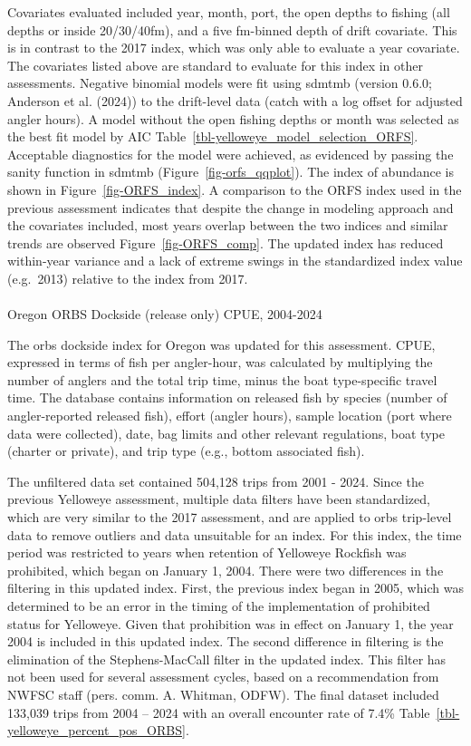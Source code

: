 \documentclass[
]{scrartcl}
\makeatletter
\let\oldparagraph\paragraph
\renewcommand{\paragraph}{
    \@ifstar
      \xxxParagraphStar
      \xxxParagraphNoStar
  }
\newcommand{\xxxParagraphStar}[1]{\oldparagraph*{#1}\mbox{}}
\newcommand{\xxxParagraphNoStar}[1]{\oldparagraph{#1}\mbox{}}
\makeatother
\begin{document}
Covariates evaluated included year, month, port, the open depths to
fishing (all depths or inside 20/30/40fm), and a five fm-binned depth of
drift covariate. This is in contrast to the 2017 index, which was only
able to evaluate a year covariate. The covariates listed above are
standard to evaluate for this index in other assessments. Negative
binomial models were fit using \gls{sdmtmb} (version 0.6.0; Anderson et
al. (2024)) to the drift-level data (catch with a log offset for
adjusted angler hours). A model without the open fishing depths or month
was selected as the best fit model by AIC
Table~\ref{tbl-yelloweye_model_selection_ORFS}. Acceptable diagnostics
for the model were achieved, as evidenced by passing the sanity function
in \gls{sdmtmb} (Figure~\ref{fig-orfs_qqplot}). The index of abundance
is shown in Figure~\ref{fig-ORFS_index}. A comparison to the ORFS index
used in the previous assessment indicates that despite the change in
modeling approach and the covariates included, most years overlap
between the two indices and similar trends are observed
Figure~\ref{fig-ORFS_comp}. The updated index has reduced within-year
variance and a lack of extreme swings in the standardized index value
(e.g.~2013) relative to the index from 2017.

\paragraph{Oregon ORBS Dockside (release only) CPUE,
2004-2024}\label{oregon-orbs-dockside-release-only-cpue-2004-2024}

The \gls{orbs} dockside index for Oregon was updated for this
assessment. CPUE, expressed in terms of fish per angler-hour, was
calculated by multiplying the number of anglers and the total trip time,
minus the boat type-specific travel time. The database contains
information on released fish by species (number of angler-reported
released fish), effort (angler hours), sample location (port where data
were collected), date, bag limits and other relevant regulations, boat
type (charter or private), and trip type (e.g., bottom associated fish).

The unfiltered data set contained 504,128 trips from 2001 - 2024. Since
the previous Yelloweye assessment, multiple data filters have been
standardized, which are very similar to the 2017 assessment, and are
applied to \gls{orbs} trip-level data to remove outliers and data
unsuitable for an index. For this index, the time period was restricted
to years when retention of Yelloweye Rockfish was prohibited, which
began on January 1, 2004. There were two differences in the filtering in
this updated index. First, the previous index began in 2005, which was
determined to be an error in the timing of the implementation of
prohibited status for Yelloweye. Given that prohibition was in effect on
January 1, the year 2004 is included in this updated index. The second
difference in filtering is the elimination of the Stephens-MacCall
filter in the updated index. This filter has not been used for several
assessment cycles, based on a recommendation from NWFSC staff (pers.
comm. A. Whitman, ODFW). The final dataset included 133,039 trips from
2004 -- 2024 with an overall encounter rate of 7.4\%
Table~\ref{tbl-yelloweye_percent_pos_ORBS}.
\end{document}
